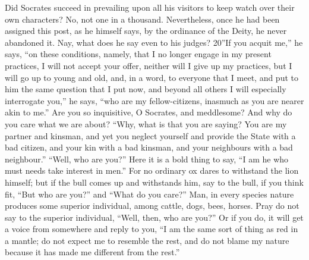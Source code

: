 Did Socrates succeed in prevailing upon all his visitors to keep watch over their own characters? No, not one in a thousand. Nevertheless, once he had been assigned this post, as he himself says, by the ordinance of the Deity, he never abandoned it. Nay, what does he say even to his judges? 20''If you acquit me,'' he says, ``on these conditions, namely, that I no longer engage in my present practices, I will not accept your offer, neither will I give up my practices, but I will go up to young and old, and, in a word, to everyone that I meet, and put to him the same question that I put now, and beyond all others I will especially interrogate you,'' he says, ``who are my fellow-citizens, inasmuch as you are nearer akin to me.'' Are you so inquisitive, O Socrates, and meddlesome? And why do you care what we are about? ``Why, what is that you are saying? You are my partner and kinsman, and yet you neglect yourself and provide the State with a bad citizen, and your kin with a bad kinsman, and your neighbours with a bad neighbour.'' ``Well, who are you?'' Here it is a bold thing to say, ``I am he who must needs take interest in men.'' For no ordinary ox dares to withstand the lion himself; but if the bull comes up and withstands him, say to the bull, if you think fit, ``But who are you?'' and ``What do you care?'' Man, in every species nature produces some superior individual, among cattle, dogs, bees, horses. Pray do not say to the superior individual, ``Well, then, who are you?'' Or if you do, it will get a voice from somewhere and reply to you, ``I am the same sort of thing as red in a mantle; do not expect me to resemble the rest, and do not blame my nature because it has made me different from the rest.''

